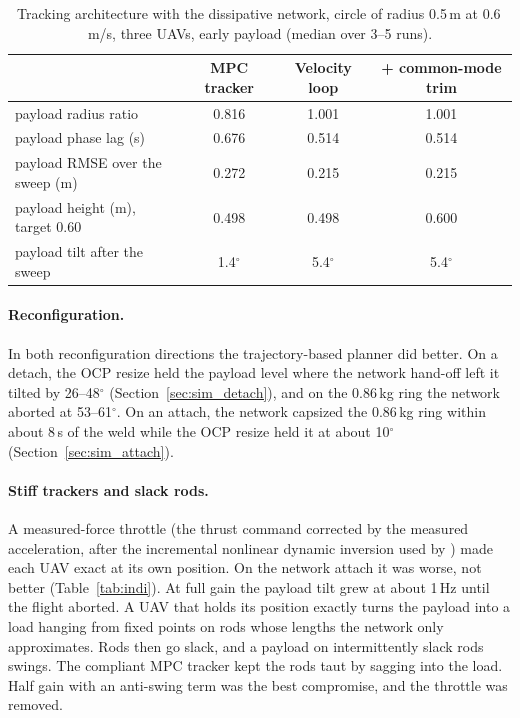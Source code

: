 \begin{table}[h]
\centering
\caption{Tracking architecture with the dissipative network, circle of radius 0.5\,m at 0.6\,m/s,
three UAVs, early payload (median over 3--5 runs).}
\label{tab:arch}
\begin{tabularx}{\textwidth}{Xccc}
\toprule
 & MPC tracker & Velocity loop & + common-mode trim \\
\midrule
payload radius ratio & 0.816 & 1.001 & 1.001 \\
payload phase lag (s) & 0.676 & 0.514 & 0.514 \\
payload RMSE over the sweep (m) & 0.272 & 0.215 & 0.215 \\
payload height (m), target 0.60 & 0.498 & 0.498 & 0.600 \\
payload tilt after the sweep & 1.4$^\circ$ & 5.4$^\circ$ & 5.4$^\circ$ \\
\bottomrule
\end{tabularx}
\end{table}

\paragraph{Reconfiguration.} In both reconfiguration directions the trajectory-based planner did
better. On a detach, the OCP resize held the payload level where the network hand-off left it tilted
by 26--48$^\circ$ (Section~\ref{sec:sim_detach}), and on the 0.86\,kg ring the network aborted at
53--61$^\circ$. On an attach, the network capsized the 0.86\,kg ring within about 8\,s of the weld
while the OCP resize held it at about 10$^\circ$ (Section~\ref{sec:sim_attach}).

\paragraph{Stiff trackers and slack rods.} A measured-force throttle (the thrust command corrected by
the measured acceleration, after the incremental nonlinear dynamic inversion \cite{smeur2016indi} used by
\cite{tudelft}) made each
UAV exact at its own position. On the network attach it was worse, not better
(Table~\ref{tab:indi}). At full gain the payload tilt grew at about 1\,Hz until the flight aborted.
A UAV that holds its position exactly turns the payload into a load hanging from fixed points on
rods whose lengths the network only approximates. Rods then go slack, and a payload on
intermittently slack rods swings. The compliant MPC tracker kept the rods taut by sagging into the
load. Half gain with an anti-swing term was the best compromise, and the throttle was removed.

